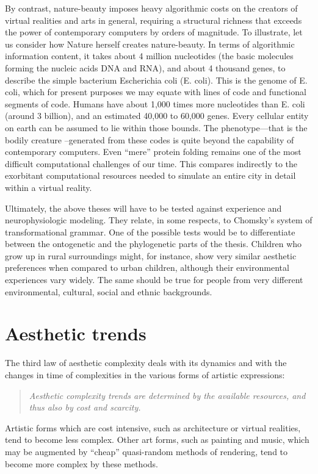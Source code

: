 \documentclass[%
 reprint,
 showpacs,
 showkeys,
 amsmath,
 amssymb,
 aps,
 pra,
 longbibliography,
 floatfix,
 ]{revtex4-1}
\begin{document}
By contrast, nature-beauty imposes heavy algorithmic costs on the creators of
virtual realities and arts in general, requiring a structural richness that
exceeds the power of contemporary computers by orders of magnitude.
To illustrate, let us consider how Nature herself creates nature-beauty. In
terms of algorithmic information content, it takes about 4 million
nucleotides (the basic molecules forming the nucleic acids DNA and RNA), and
about 4 thousand genes, to describe the simple bacterium Escherichia coli
(E. coli). This is the genome of E. coli, which for present purposes we may
equate with lines of code and functional segments of code.
Humans have about 1,000 times more nucleotides
than E. coli (around 3 billion), and an estimated 40,000 to 60,000 genes.
Every cellular entity on earth can be assumed to lie within those bounds.
The phenotype---that is the bodily creature --generated from these codes is
quite beyond the capability of contemporary computers. Even ``mere'' protein
folding remains one of the most difficult computational challenges of our
time. This compares indirectly to the exorbitant computational resources
needed to simulate an entire city in detail within a virtual reality.


Ultimately, the above theses will have to be tested against
experience and neurophysiologic modeling. They relate, in some respects,
to Chomsky's system of transformational grammar. One of the possible tests
would be to differentiate between the ontogenetic and the phylogenetic parts
of the thesis. Children who grow up in rural surroundings might, for
instance, show very similar aesthetic preferences when compared to urban
children, although their environmental experiences vary widely. The same
should be true for people from very different environmental, cultural,
social and ethnic backgrounds.



\section{Aesthetic trends}

The third law of aesthetic complexity deals with its dynamics and with the changes in time of complexities in the various forms of artistic expressions:
\begin{quote}
{\em
Aesthetic complexity trends are determined by the available resources, and thus also by cost and scarcity.
}
\end{quote}

Artistic forms which are cost intensive, such as architecture or virtual realities, tend to become less complex.
Other art forms, such as painting and music, which may be augmented by ``cheap'' quasi-random methods of rendering, tend to become more complex by these methods.
\end{document}
